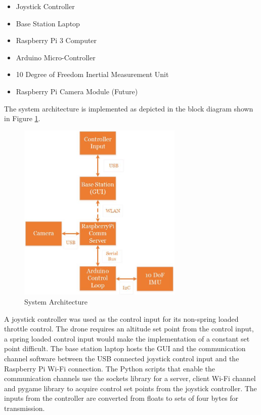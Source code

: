 \begin{itemize}
\item Joystick Controller
\item Base Station Laptop
\item Raspberry Pi 3 Computer
\item Arduino Micro-Controller
\item 10 Degree of Freedom Inertial Measurement Unit
\item Raspberry Pi Camera Module (Future)
\end{itemize}


The system architecture is implemented as depicted in the block diagram shown in Figure \ref{fig:sys_arch}. 

\begin{figure}[H]
	\centering
	\includegraphics[width=0.7\textwidth]{flowchart-architecture.jpg}
	\caption{System Architecture}
	\label{fig:sys_arch}	
\end{figure}



A joystick controller was used as the control input for its non-spring loaded throttle control. The drone requires an altitude set point from the control input, a spring loaded control input would make the implementation of a constant set point difficult. The base station laptop hosts the GUI and the communication channel software between the USB connected joystick control input and the Raspberry Pi Wi-Fi connection. The Python scripts that enable the communication channels use the sockets library for a server, client Wi-Fi channel and pygame library to acquire control set points from the joystick controller. The inputs from the controller are converted from floats to sets of four bytes for transmission.

